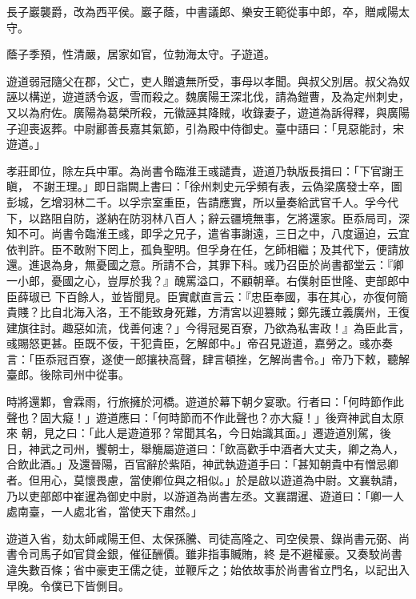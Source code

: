 \begin{pinyinscope}
 長子巖襲爵，改為西平侯。巖子蔭，中書議郎、樂安王範從事中郎，卒，贈咸陽太守。



 蔭子季預，性清嚴，居家如官，位勃海太守。子遊道。



 遊道弱冠隨父在郡，父亡，吏人贈遺無所受，事母以孝聞。與叔父別居。叔父為奴誣以構逆，遊道誘令返，雪而殺之。魏廣陽王深北伐，請為鎧曹，及為定州刺史，又以為府佐。廣陽為葛榮所殺，元徽誣其降賊，收錄妻子，遊道為訴得釋，與廣陽子迎喪返葬。中尉酈善長嘉其氣節，引為殿中侍御史。臺中語曰：「見惡能討，宋遊道。」



 孝莊即位，除左兵中軍。為尚書令臨淮王彧譴責，遊道乃執版長揖曰：「下官謝王瞋，
 不謝王理。」即日詣闕上書曰：「徐州刺史元孚頻有表，云偽梁廣發士卒，圖彭城，乞增羽林二千。以孚宗室重臣，告請應實，所以量奏給武官千人。孚今代下，以路阻自防，遂納在防羽林八百人；辭云疆境無事，乞將還家。臣忝局司，深知不可。尚書令臨淮王彧，即孚之兄子，遣省事謝遠，三日之中，八度逼迫，云宜依判許。臣不敢附下罔上，孤負聖明。但孚身在任，乞師相繼；及其代下，便請放還。進退為身，無憂國之意。所請不合，其罪下科。彧乃召臣於尚書都堂云：『卿一小郎，憂國之心，豈厚於我？』醜罵溢口，不顧朝章。右僕射臣世隆、吏部郎中臣薛琡已
 下百餘人，並皆聞見。臣實獻直言云：『忠臣奉國，事在其心，亦復何簡貴賤？比自北海入洛，王不能致身死難，方清宮以迎篡賊；鄭先護立義廣州，王復建旗往討。趣惡如流，伐善何速？」今得冠冕百寮，乃欲為私害政！』為臣此言，彧賜怒更甚。臣既不佞，干犯貴臣，乞解郎中。」帝召見遊道，嘉勞之。彧亦奏言：「臣忝冠百寮，遂使一郎攘袂高聲，肆言頓挫，乞解尚書令。」帝乃下敕，聽解臺郎。後除司州中從事。



 時將還鄴，會霖雨，行旅擁於河橋。遊道於幕下朝夕宴歌。行者曰：「何時節作此聲也？固大癡！」遊道應曰：「何時節而不作此聲也？亦大癡！」後齊神武自太原來
 朝，見之曰：「此人是遊道邪？常聞其名，今日始識其面。」遷遊道別駕，後日，神武之司州，饗朝士，舉觴屬遊道曰：「飲高歡手中酒者大丈夫，卿之為人，合飲此酒。」及還晉陽，百官辭於紫陌，神武執遊道手曰：「甚知朝貴中有憎忌卿者。但用心，莫懷畏慮，當使卿位與之相似。」於是啟以遊道為中尉。文襄執請，乃以吏部郎中崔暹為御史中尉，以游道為尚書左丞。文襄謂暹、遊道曰：「卿一人處南臺，一人處北省，當使天下肅然。」



 遊道入省，劾太師咸陽王但、太保孫騰、司徒高隆之、司空侯景、錄尚書元弼、尚書令司馬子如官貸金銀，催征酬價。雖非指事贓賄，終
 是不避權豪。又奏駮尚書違失數百條；省中豪吏王儒之徒，並鞭斥之；始依故事於尚書省立門名，以記出入早晚。令僕已下皆側目。




\end{pinyinscope}

